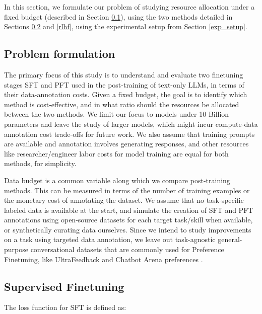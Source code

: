In this section, we formulate our problem of studying resource allocation under a fixed budget (described in Section \ref{problem}), using the two methods detailed in Sections \ref{sft} and \ref{rlhf}, using the experimental setup from Section \ref{exp_setup}.

\subsection{Problem formulation}

\label{problem}

The primary focus of this study is to understand and evaluate two finetuning stages SFT and PFT used in the post-training of text-only LLMs, in terms of their data-annotation costs. Given a fixed budget, the goal is to identify which method is cost-effective, and in what ratio should the resources be allocated between the two methods. We limit our focus to models under 10 Billion parameters and leave the study of larger models, which might incur compute-data annotation cost trade-offs \cite{bai-etal-2021-pre} for future work. We also assume that training prompts are available and annotation involves generating responses, and other resources like researcher/engineer labor costs for model training are equal for both methods, for simplicity.

Data budget is a common variable along which we compare post-training methods. This can be measured in terms of the number of training examples or the monetary cost of annotating the dataset. We assume that no task-specific labeled data is available at the start, and simulate the creation of SFT and PFT annotations using open-source datasets for each target task/skill when available, or synthetically curating data ourselves. Since we intend to study improvements on a task using targeted data annotation, we leave out task-agnostic general-purpose conversational datasets that are commonly used for Preference Finetuning, like UltraFeedback \citep{cui2023ultrafeedback} and Chatbot Arena preferences \citep{chiang2024chatbot}.  

\subsection{Supervised Finetuning}

\label{sft}

The loss function for SFT is defined as: 

\vspace{-7mm}

